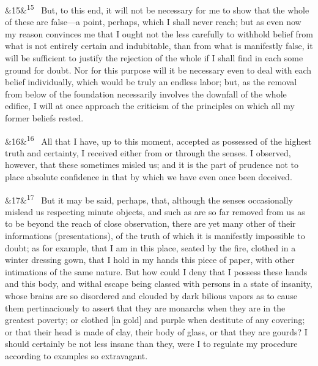 \documentclass[12pt]{article}
\newcommand{\para}[1][]{\par\noindent\ifx&#1&\else\textsuperscript{\footnotesize #1}~\fi}
\begin{document}
\para[15] But, to this end, it will not be necessary for me to show that the whole of these are false---a point, perhaps, which I shall never reach; but as even now my reason convinces me that I ought not the less carefully to withhold belief from what is not entirely certain and indubitable, than from what is manifestly false, it will be sufficient to justify the rejection of the whole if I shall find in each some ground for doubt. Nor for this purpose will it be necessary even to deal with each belief individually, which would be truly an endless labor; but, as the removal from below of the foundation necessarily involves the downfall of the whole edifice, I will at once approach the criticism of the principles on which all my former beliefs rested.

\para[16] All that I have, up to this moment, accepted as possessed of the highest truth and certainty, I received either from or through the senses. I observed, however, that these sometimes misled us; and it is the part of prudence not to place absolute confidence in that by which we have even once been deceived.

\para[17] But it may be said, perhaps, that, although the senses occasionally mislead us respecting minute objects, and such as are so far removed from us as to be beyond the reach of close observation, there are yet many other of their informations (presentations), of the truth of which it is manifestly impossible to doubt; as for example, that I am in this place, seated by the fire, clothed in a winter dressing gown, that I hold in my hands this piece of paper, with other intimations of the same nature. But how could I deny that I possess these hands and this body, and withal escape being classed with persons in a state of insanity, whose brains are so disordered and clouded by dark bilious vapors as to cause them pertinaciously to assert that they are monarchs when they are in the greatest poverty; or clothed [in gold] and purple when destitute of any covering; or that their head is made of clay, their body of glass, or that they are gourds? I should certainly be not less insane than they, were I to regulate my procedure according to examples so extravagant.
\end{document}
